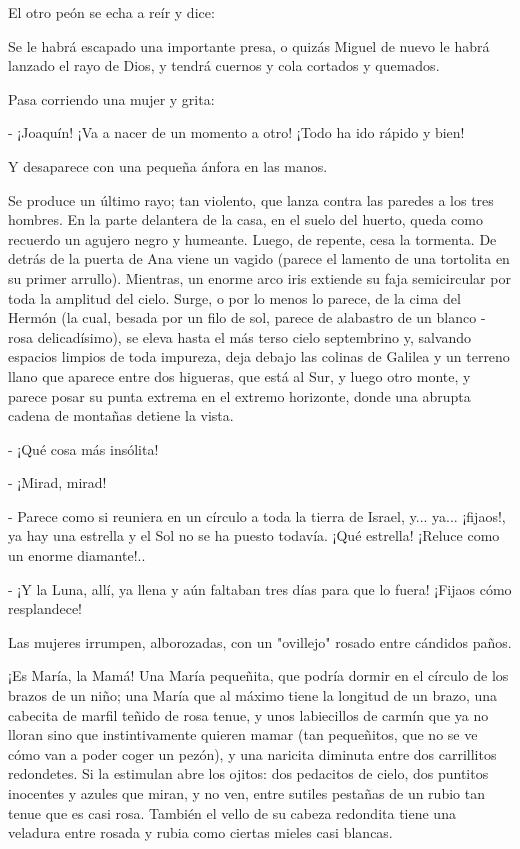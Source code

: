 \documentclass[12pt]{book} %
\begin{document}
El otro peón se echa a reír y dice: 

Se le habrá escapado una importante presa, o quizás Miguel de nuevo le habrá lanzado el rayo de Dios, y tendrá cuernos y cola cortados y quemados. 

Pasa corriendo una mujer y grita: 

- ¡Joaquín! ¡Va a nacer de un momento a otro! ¡Todo ha ido rápido y bien! 

Y desaparece con una pequeña ánfora en las manos. 

Se produce un último rayo; tan violento, que lanza contra las paredes a los tres hombres. En la parte delantera de la casa, en el suelo del huerto, queda como recuerdo un agujero negro y humeante. Luego, de repente, cesa la tormenta. De detrás de la puerta de Ana viene un vagido (parece el lamento de una tortolita en su primer arrullo). Mientras, un enorme arco iris extiende su faja semicircular por toda la amplitud del cielo. Surge, o por lo menos lo parece, de la cima del Hermón (la cual, besada por un filo de sol, parece de alabastro de un blanco - rosa delicadísimo), se eleva hasta el más terso cielo septembrino y, salvando espacios limpios de toda impureza, deja debajo las colinas de Galilea y un terreno llano que aparece entre dos higueras, que está al Sur, y luego otro monte, y parece posar su punta extrema en el extremo horizonte, donde una abrupta cadena de montañas detiene la vista. 

- ¡Qué cosa más insólita! 

- ¡Mirad, mirad! 

- Parece como si reuniera en un círculo a toda la tierra de Israel, y... ya... ¡fijaos!, ya hay una estrella y el Sol no se ha puesto todavía. ¡Qué estrella! ¡Reluce como un enorme diamante!.. 

- ¡Y la Luna, allí, ya llena y aún faltaban tres días para que lo fuera! ¡Fijaos cómo resplandece! 

Las mujeres irrumpen, alborozadas, con un "ovillejo" rosado entre cándidos paños. 

¡Es María, la Mamá! Una María pequeñita, que podría dormir en el círculo de los brazos de un niño; una María que al máximo tiene la longitud de un brazo, una cabecita de marfil teñido de rosa tenue, y unos labiecillos de carmín que ya no lloran sino que instintivamente quieren mamar (tan pequeñitos, que no se ve cómo van a poder coger un pezón), y una naricita diminuta entre dos carrillitos redondetes. Si la estimulan abre los ojitos: dos pedacitos de cielo, dos puntitos inocentes y azules que miran, y no ven, entre sutiles pestañas de un rubio tan tenue que es casi rosa. También el vello de su cabeza redondita tiene una veladura entre rosada y rubia como ciertas mieles casi blancas. 
\end{document}
